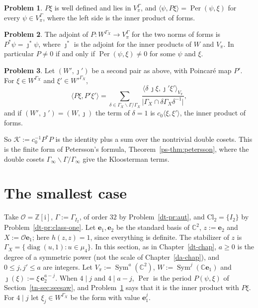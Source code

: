 \documentclass[reqno]{amsart}
\newcounter{chap}
\theoremstyle{definition}
\newtheorem{problem}{Problem}[section]
\theoremstyle{plain}
\theoremstyle{remark}
\newcommand{\Z}{{\mathbb{Z}}}
\newcommand{\C}{{\mathbb{C}}}
\newcommand{\Oc}{\mathcal O}
\newcommand{\Kc}{\mathcal K}
\newcommand{\be}{\mathbf e}
\newcommand{\Sym}{\operatorname{Sym}}
\newcommand{\diag}{\operatorname{diag}}
\newcommand{\Per}{\operatorname{Per}}
\newcommand{\Cl}{\mathrm{Cl}}
\begin{document}
\begin{problem}\label{pr:unfold}
\(P\xi\) is well defined and lies in \(V_\pi^\Gamma\), and \(\langle\psi,P\xi\rangle=\Per(\psi,\xi)\) for every \(\psi\in V_\pi^\Gamma\), where the left side is the inner product of forms.
\end{problem}

\begin{problem}\label{pr:adjoint}
The adjoint of \(P\colon W^{\Gamma_X}\to V_\pi^\Gamma\) for the two norms of forms is \(P^*\psi=\jmath^*\psi\), where \(\jmath^*\) is the adjoint for the inner products of \(W\) and \(V_\pi\).  In particular \(P\ne0\) if and only if \(\Per(\psi,\xi)\ne0\) for some \(\psi\) and \(\xi\).
\end{problem}

\begin{problem}\label{pr:expansion}
Let \((W',\jmath')\) be a second pair as above, with Poincar\'e map \(P'\).  For \(\xi\in W^{\Gamma_X}\) and \(\xi'\in W'^{\Gamma_X}\),
\[
 \langle P\xi,P'\xi'\rangle=\sum_{\delta\in\Gamma_X\backslash\Gamma/\Gamma_X}\frac{\langle\delta\,\jmath\xi,\jmath'\xi'\rangle_{V_\pi}}{\lvert\Gamma_X\cap\delta\Gamma_X\delta^{-1}\rvert} ,
\]
and if \((W',\jmath')=(W,\jmath)\) the term of \(\delta=1\) is \(c_0\langle\xi,\xi'\rangle\), the inner product of forms.
\end{problem}

So \(\Kc:=c_0^{-1}P^*P\) is the identity plus a sum over the nontrivial double cosets.  This is the finite form of Petersson's formula, Theorem~\ref{ps-thm:petersson}, where the double cosets \(\Gamma_\infty\backslash\Gamma/\Gamma_\infty\) give the Kloosterman terms.

\section{The smallest case}\label{sec:smallest}

Take \(\Oc=\Z[\mathrm i]\), \(\Gamma:=\Gamma_{I_2}\), of order \(32\) by Problem~\ref{dt-pr:aut}, and \(\Cl_2=\{I_2\}\) by Problem~\ref{dt-pr:class-one}.  Let \(\be_1,\be_2\) be the standard basis of \(\C^2\), \(z:=\be_2\) and \(X:=\Oc\be_1\); here \(h(z,z)=1\), since everything is definite.  The stabilizer of \(z\) is \(\Gamma_X=\{\diag(u,1):u\in\mu_4\}\).  In this section, as in Chapter~\ref{dt-chap}, \(a\ge0\) is the degree of a symmetric power (not the scale of Chapter~\ref{da-chap}), and \(0\le j,j'\le a\) are integers.  Let \(V_\pi:=\Sym^a(\C^2)\), \(W:=\Sym^j(\C\be_1)\) and \(\jmath(\xi):=\xi\,\be_2^{a-j}\).  When \(4\mid j\) and \(4\mid a-j\), \(\Per\) is the period \(P(\psi,\xi)\) of Section~\ref{tn-sec:seesaw}, and Problem~\ref{pr:unfold} says that it is the inner product with \(P\xi\).  For \(4\mid j\) let \(\xi_j\in W^{\Gamma_X}\) be the form with value \(\be_1^j\).
\end{document}
